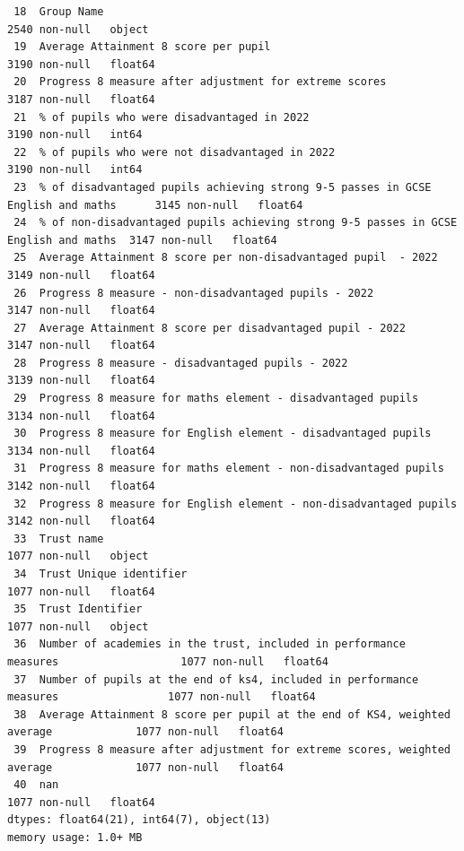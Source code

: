 \documentclass[
  letterpaper,
  DIV=11,
  numbers=noendperiod]{scrartcl}
\begin{document}
\begin{verbatim}
 18  Group Name                                                                           2540 non-null   object 
 19  Average Attainment 8 score per pupil                                                 3190 non-null   float64
 20  Progress 8 measure after adjustment for extreme scores                               3187 non-null   float64
 21  % of pupils who were disadvantaged in 2022                                           3190 non-null   int64  
 22  % of pupils who were not disadvantaged in 2022                                       3190 non-null   int64  
 23  % of disadvantaged pupils achieving strong 9-5 passes in GCSE English and maths      3145 non-null   float64
 24  % of non-disadvantaged pupils achieving strong 9-5 passes in GCSE English and maths  3147 non-null   float64
 25  Average Attainment 8 score per non-disadvantaged pupil  - 2022                       3149 non-null   float64
 26  Progress 8 measure - non-disadvantaged pupils - 2022                                 3147 non-null   float64
 27  Average Attainment 8 score per disadvantaged pupil - 2022                            3147 non-null   float64
 28  Progress 8 measure - disadvantaged pupils - 2022                                     3139 non-null   float64
 29  Progress 8 measure for maths element - disadvantaged pupils                          3134 non-null   float64
 30  Progress 8 measure for English element - disadvantaged pupils                        3134 non-null   float64
 31  Progress 8 measure for maths element - non-disadvantaged pupils                      3142 non-null   float64
 32  Progress 8 measure for English element - non-disadvantaged pupils                    3142 non-null   float64
 33  Trust name                                                                           1077 non-null   object 
 34  Trust Unique identifier                                                              1077 non-null   float64
 35  Trust Identifier                                                                     1077 non-null   object 
 36  Number of academies in the trust, included in performance measures                   1077 non-null   float64
 37  Number of pupils at the end of ks4, included in performance measures                 1077 non-null   float64
 38  Average Attainment 8 score per pupil at the end of KS4, weighted average             1077 non-null   float64
 39  Progress 8 measure after adjustment for extreme scores, weighted average             1077 non-null   float64
 40  nan                                                                                  1077 non-null   float64
dtypes: float64(21), int64(7), object(13)
memory usage: 1.0+ MB
\end{verbatim}
\end{document}
